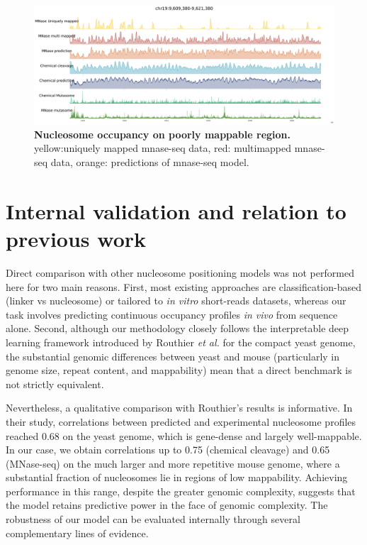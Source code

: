 \documentclass[11pt]{book}
\begin{document}
\begin{figure}[htbp]
    \centering
    \includegraphics[width=\textwidth]{Figures/Results/genome_browser_poorlyMapped_3.pdf}
    \caption{\textbf{Nucleosome occupancy on poorly mappable region.} yellow:uniquely mapped mnase-seq data, red: multimapped mnase-seq data, orange: predictions of mnase-seq model.}

    \label{fig:poorly_mappable_extract}
\end{figure}

\FloatBarrier
\clearpage
\section{Internal validation and relation to previous work}
Direct comparison with other nucleosome positioning models was not performed here for two main reasons.  
First, most existing approaches are classification-based (linker vs nucleosome) or tailored to \textit{in vitro} short-reads datasets, whereas our task involves predicting continuous occupancy profiles \textit{in vivo} from sequence alone.  
Second, although our methodology closely follows the interpretable deep learning framework introduced by Routhier \textit{et al.} for the compact yeast genome, the substantial genomic differences between yeast and mouse (particularly in genome size, repeat content, and mappability) mean that a direct benchmark is not strictly equivalent.  

Nevertheless, a qualitative comparison with Routhier’s results is informative. In their study, correlations between predicted and experimental nucleosome profiles reached 0.68 on the yeast genome\cite{routhier_genome-wide_2021}, which is gene-dense and largely well-mappable.  
In our case, we obtain correlations up to 0.75 (chemical cleavage) and 0.65 (MNase-seq) on the much larger and more repetitive mouse genome, where a substantial fraction of nucleosomes lie in regions of low mappability.  
Achieving performance in this range, despite the greater genomic complexity, suggests that the model retains predictive power in the face of genomic complexity. The robustness of our model can be evaluated internally through several complementary lines of evidence.
\end{document}
